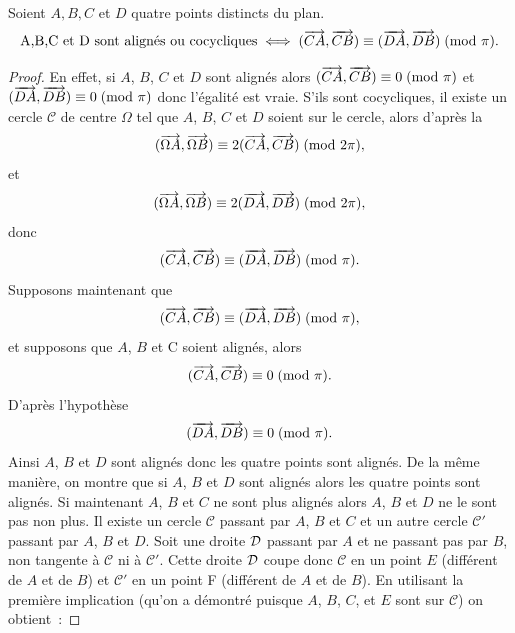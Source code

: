 \begin{theo}
  Soient \(A,B,C\) et \(D\) quatre points distincts du plan.
  \begin{equation}
    \text{A,B,C et D sont alignés ou cocycliques} \iff (\overrightarrow{CA}, \overrightarrow{CB}) \equiv (\overrightarrow{DA}, \overrightarrow{DB})\!\pmod {\pi}.
  \end{equation}
\end{theo}
\begin{proof}
  En effet, si \(A\), \(B\), \(C\) et \(D\) sont alignés alors 
  \((\overrightarrow{CA},\overrightarrow{CB}) \equiv 0\!\pmod {\pi}\) et 
  \((\overrightarrow{DA},\overrightarrow{DB}) \equiv 0\!\pmod {\pi}\) donc l'égalité est vraie. S'ils 
  sont cocycliques, il existe un cercle \(\mathcal{C}\) de centre \(\Omega\) tel 
  que \(A\), \(B\), \(C\) et \(D\) soient sur le cercle, alors d'après la 
  \begin{equation}
    (\overrightarrow{\Omega A}, \overrightarrow{\Omega B}) \equiv 2(\overrightarrow{CA},\overrightarrow{CB})\!\pmod {2\pi},
  \end{equation}
  et 
  \begin{equation}
    (\overrightarrow{\Omega A}, \overrightarrow{\Omega B}) \equiv 2(\overrightarrow{DA},\overrightarrow{DB})\!\pmod {2\pi},
  \end{equation}
  donc 
  \begin{equation}
    (\overrightarrow{CA},\overrightarrow{CB}) \equiv (\overrightarrow{DA},\overrightarrow{DB})\!\pmod {\pi}.
  \end{equation}
  Supposons maintenant que 
  \begin{equation}
    (\overrightarrow{CA},\overrightarrow{CB}) \equiv (\overrightarrow{DA},\overrightarrow{DB})\!\pmod {\pi},
  \end{equation}
  et supposons que \(A\), \(B\) et C soient alignés, alors 
  \begin{equation}
    (\overrightarrow{CA},\overrightarrow{CB}) \equiv 0\!\pmod {\pi}.
  \end{equation}
  D'après l'hypothèse
  \begin{equation}
    (\overrightarrow{DA},\overrightarrow{DB}) \equiv 0\!\pmod {\pi}.
  \end{equation}
  Ainsi \(A\), \(B\) et \(D\) sont alignés donc les quatre points sont alignés. De la même manière, on montre que si \(A\), \(B\) et \(D\) sont alignés alors les quatre points sont alignés. Si maintenant \(A\), \(B\) et \(C\) ne sont plus alignés alors \(A\), \(B\) et \(D\) ne le sont pas non plus. Il existe un cercle \(\mathcal{C}\) passant par \(A\), \(B\) et \(C\) et un autre cercle \(\mathcal{C}'\) passant par \(A\), \(B\) et \(D\). Soit une droite \(\mathcal{D}\) passant par \(A\) et ne passant pas par \(B\), non tangente à \(\mathcal{C}\) ni à \(\mathcal{C}'\). Cette droite \(\mathcal{D}\) coupe donc \(\mathcal{C}\) en un point \(E\) (différent de \(A\) et de \(B\)) et \(\mathcal{C}'\) en un point F (différent de \(A\) et de \(B\)). En utilisant la première implication (qu'on a démontré puisque \(A\), \(B\), \(C\), et \(E\) sont sur \(\mathcal{C}\)) on obtient~:

\end{proof}
